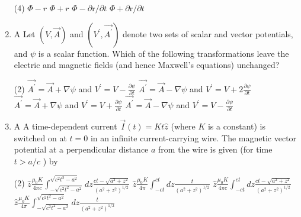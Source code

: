 \begin{enumerate}
	{	}
	\begin{tasks}(4)
		\task[\textbf{A.}] $\Phi-r$
		\task[\textbf{B.}] $\Phi+r$
		\task[\textbf{C.}] $\Phi-\partial \mathrm{r} / \partial t$
		\task[\textbf{D.}] $\Phi+\partial \mathrm{r} / \partial t$
	\end{tasks}
	\item
	A Let $(V, \vec{A})$ and $\left(V^{\prime}, \overrightarrow{A^{\prime}}\right)$ denote two sets of scalar and vector potentials, and $\psi$ is a scalar function. Which of the following transformations leave the electric and magnetic fields (and hence Maxwell's equations) unchanged?
	{}
	\begin{tasks}(2)
		\task[\textbf{A.}] $\overrightarrow{A^{\prime}}=\vec{A}+\nabla \psi$ and $V^{\prime}=V-\frac{\partial \psi}{\partial t}$
		\task[\textbf{B.}] $\overrightarrow{A^{\prime}}=\vec{A}-\nabla \psi$ and $V^{\prime}=V+2 \frac{\partial \psi}{\partial t}$
		\task[\textbf{C.}] $\overrightarrow{A^{\prime}}=\vec{A}+\nabla \psi$ and $V^{\prime}=V+\frac{\partial \psi}{\partial t}$
		\task[\textbf{D.}] $\overrightarrow{A^{\prime}}=\vec{A}-\nabla \psi$ and $V^{\prime}=V-\frac{\partial \psi}{\partial t}$
	\end{tasks}
	\item
	A A time-dependent current $\vec{I}(t)=K t \hat{z}$ (where $K$ is a constant) is switched on at $t=0$ in an infinite current-carrying wire. The magnetic vector potential at a perpendicular distance $a$ from the wire is given (for time $t>a / c$ ) by
	{	}
	\begin{tasks}(2)
		\task[\textbf{A.}]  $\hat{z} \frac{\mu_{0} K}{4 \pi c} \int_{-\sqrt{c^{2} t^{2}-a^{2}}}^{\sqrt{c^{2} t^{2}-a^{2}}} d z \frac{c t-\sqrt{a^{2}+z^{2}}}{\left(a^{2}+z^{2}\right)^{1 / 2}}$
		\task[\textbf{B.}]  $\hat{z} \frac{\mu_{0} K}{4 \pi} \int_{-c t}^{c t} d z \frac{t}{\left(a^{2}+z^{2}\right)^{1 / 2}}$
		\task[\textbf{C.}] $\hat{z} \frac{\mu_{0} K}{4 \pi c} \int_{-c t}^{c t} d z \frac{c t-\sqrt{a^{2}+z^{2}}}{\left(a^{2}+z^{2}\right)^{1 / 2}}$
		\task[\textbf{D.}] $\hat{z} \frac{\mu_{0} K}{4 \pi} \int_{-\sqrt{c^{2} t^{2}-a^{2}}}^{\sqrt{c^{2} t^{2}-a^{2}}} d z \frac{t}{\left(a^{2}+z^{2}\right)^{1 / 2}}$
	\end{tasks}
	

\end{enumerate}
